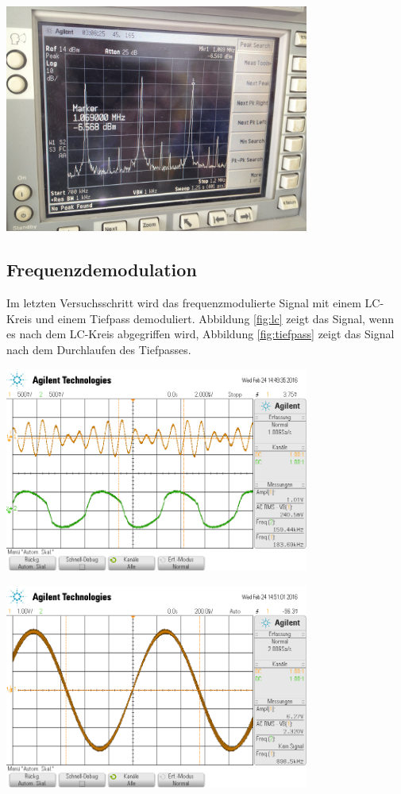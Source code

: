 \documentclass[]{scrartcl}
\begin{document}
\begin{center}
	\includegraphics[width=10cm]{images/freqmodfreq.jpg}
	\label{fig:freqmodfreq}
\end{center}
\subsection{Frequenzdemodulation}
Im letzten Versuchsschritt wird das frequenzmodulierte Signal mit einem LC-Kreis und einem Tiefpass demoduliert. Abbildung \ref{fig:lc} zeigt das Signal, wenn es nach dem LC-Kreis abgegriffen wird, Abbildung \ref{fig:tiefpass} zeigt das Signal nach dem Durchlaufen des Tiefpasses. \\
\begin{center}
	\includegraphics[width=10cm]{images/lc.png}
	\label{fig:lc}
\end{center}
\begin{center}
	\includegraphics[width=10cm]{images/tiefpass.png}
	\label{fig:tiefpass}
\end{center}
\end{document}
